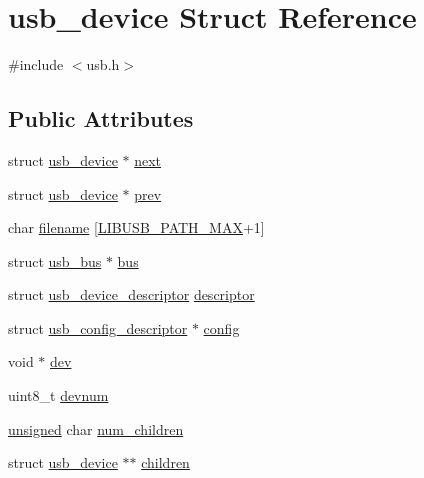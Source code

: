\hypertarget{structusb__device}{\section{usb\-\_\-device Struct Reference}
\label{structusb__device}
}


{\ttfamily \#include $<$usb.\-h$>$}

\subsection*{Public Attributes}
\begin{DoxyCompactItemize}
\item 
struct \hyperlink{structusb__device}{usb\-\_\-device} $\ast$ \hyperlink{structusb__device_a83611947394f9efcce4968c87c43a5ab}{next}
\item 
struct \hyperlink{structusb__device}{usb\-\_\-device} $\ast$ \hyperlink{structusb__device_a0f17263bca031533ee31834e4ad8f71a}{prev}
\item 
char \hyperlink{structusb__device_a11384a2a94b0e712ae21d975265fbce3}{filename} \mbox{[}\hyperlink{usb_8h_a927364bf724921dbce110225b861b900}{L\-I\-B\-U\-S\-B\-\_\-\-P\-A\-T\-H\-\_\-\-M\-A\-X}+1\mbox{]}
\item 
struct \hyperlink{structusb__bus}{usb\-\_\-bus} $\ast$ \hyperlink{structusb__device_abec6a0ebc18d6aea7469cf459b44eb2d}{bus}
\item 
struct \hyperlink{structusb__device__descriptor}{usb\-\_\-device\-\_\-descriptor} \hyperlink{structusb__device_a33bbd71be994f58bf95c34f8a56db11f}{descriptor}
\item 
struct \hyperlink{structusb__config__descriptor}{usb\-\_\-config\-\_\-descriptor} $\ast$ \hyperlink{structusb__device_a0aa599e1b3de620e5d22dd537037a9b5}{config}
\item 
void $\ast$ \hyperlink{structusb__device_a279b5d9b87d8407f6fc455e707cc445b}{dev}
\item 
uint8\-\_\-t \hyperlink{structusb__device_ada834f5ec253d168e4044a08c5c1944d}{devnum}
\item 
\hyperlink{curses_8priv_8h_aca40206900cfc164654362fa8d4ad1e6}{unsigned} char \hyperlink{structusb__device_a88363220bd62e20d3fd5672a8be44a44}{num\-\_\-children}
\item 
struct \hyperlink{structusb__device}{usb\-\_\-device} $\ast$$\ast$ \hyperlink{structusb__device_a7c2c03784df4356da72087ace6f93197}{children}
\end{DoxyCompactItemize}


